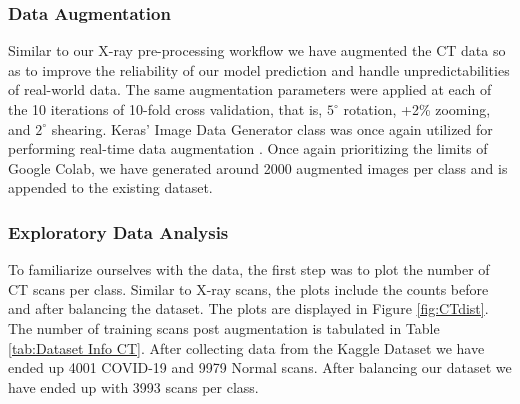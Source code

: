 \subsubsection{Data Augmentation}

Similar to our X-ray pre-processing workflow we have augmented the CT data so as to improve the reliability of our model prediction and handle unpredictabilities of real-world data. The same augmentation parameters were applied at each of the 10 iterations of 10-fold cross validation, that is, $5^{\circ}$ rotation, +2\% zooming, and $2^{\circ}$ shearing. Keras' Image Data Generator class was once again utilized for performing real-time data augmentation \cite{KER}. Once again prioritizing the limits of Google Colab, we have generated around 2000 augmented images per class and is appended to the existing dataset.

\subsubsection{Exploratory Data Analysis} \label{EDA CT}

To familiarize ourselves with the data, the first step was to plot the number of CT scans per class. Similar to X-ray scans, the plots include the counts before and after balancing the dataset. The plots are displayed in Figure \ref{fig:CTdist}. The number of training scans post augmentation is tabulated in Table \ref{tab:Dataset Info CT}. After collecting data from the Kaggle Dataset we have ended up 4001 COVID-19 and 9979 Normal scans. After balancing our dataset we have ended up with 3993 scans per class.

